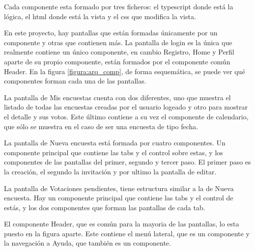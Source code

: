 \documentclass[a4paper, 12pt]{book}
\begin{document}
Cada componente esta formado por tres ficheros: el typescript donde est\'a la l\'ogica, el html donde est\'a la vista y el css que modifica la vista.

En este proyecto, hay pantallas que est\'an formadas \'unicamente por un componente y otras que contienen m\'as. La pantalla de login es la \'unica que realmente contiene un \'unico componente, en cambio Registro, Home y Perfil aparte de su propio componente, est\'an formados por el componente com\'un Header. En la figura \ref{figura:arq_comp}, de forma esquem\'atica, se puede ver qu\'e componentes forman cada una de las pantallas. 

La pantalla de Mis encuestas cuenta con dos diferentes, uno que muestra el listado de todas las encuestas creadas por el usuario logeado  y otro para mostrar el detalle y sus votos. Este \'ultimo contiene a su vez el componente de calendario, que s\'olo se muestra en el caso de ser una encuesta de tipo fecha.

La pantalla de Nueva encuesta est\'a formada por cuatro componentes. Un componente principal que contiene las tabs y el control sobre estas, y los componentes de las pantallas del primer, segundo y tercer paso. El primer paso es la creaci\'on, el segundo la invitaci\'on y por ultimo la pantalla de editar.

La pantalla de Votaciones pendientes, tiene estructura similar a la de Nueva encuesta. Hay un componente principal que contiene las tabs y el control de est\'as, y los dos componentes que forman las pantallas de cada tab.

El componente Header, que es com\'un para la mayoria de las pantallas, lo esta puesto en la figura aparte. Este contiene el men\'u lateral, que es un componente y la navegaci\'on a Ayuda, que tambi\'en es un componente.
\end{document}
